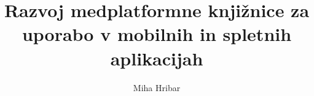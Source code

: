 \documentclass[slovene,BUNRI,twoside]{FRIthesis}
\title[LaTeX predloga][LaTeX thesis class]
      {Razvoj medplatformne knjižnice za uporabo v mobilnih in spletnih aplikacijah}{Developing a cross platform library for use in mobile and web applications}
\author{Miha Hribar}{63010042}
\begin{document}
\maketitle
\makecopyright
\thesistopic
\makedeclaration

\frontmatter
 
 
 \tableofcontents

\mainmatter
 
 
 
 
 
\end{document}
